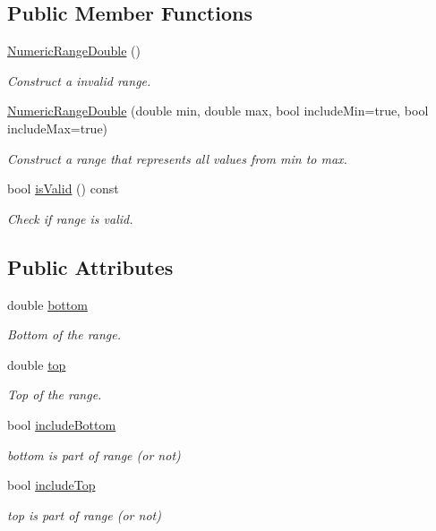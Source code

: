 \subsection*{Public Member Functions}
\begin{DoxyCompactItemize}
\item 
\hyperlink{structmdt_algorithms_1_1_numeric_range_double_add368d5a7de1c2ac042e90b7c1429ced}{Numeric\-Range\-Double} ()
\begin{DoxyCompactList}\small\item\em Construct a invalid range. \end{DoxyCompactList}\item 
\hyperlink{structmdt_algorithms_1_1_numeric_range_double_afcfeef78bbba9f4dc29727b037a6a9c5}{Numeric\-Range\-Double} (double min, double max, bool include\-Min=true, bool include\-Max=true)
\begin{DoxyCompactList}\small\item\em Construct a range that represents all values from min to max. \end{DoxyCompactList}\item 
bool \hyperlink{structmdt_algorithms_1_1_numeric_range_double_aad7ba012ebbc5e2f5267044576d53153}{is\-Valid} () const 
\begin{DoxyCompactList}\small\item\em Check if range is valid. \end{DoxyCompactList}\end{DoxyCompactItemize}
\subsection*{Public Attributes}
\begin{DoxyCompactItemize}
\item 
double \hyperlink{structmdt_algorithms_1_1_numeric_range_double_ad4a4a826ebf86f43af5f9543eb404255}{bottom}
\begin{DoxyCompactList}\small\item\em Bottom of the range. \end{DoxyCompactList}\item 
double \hyperlink{structmdt_algorithms_1_1_numeric_range_double_a2a0da5ccbeee1a3f8a613b7e7655d326}{top}
\begin{DoxyCompactList}\small\item\em Top of the range. \end{DoxyCompactList}\item 
bool \hyperlink{structmdt_algorithms_1_1_numeric_range_double_a9984b8035c067b09372d6f72efe8a380}{include\-Bottom}
\begin{DoxyCompactList}\small\item\em bottom is part of range (or not) \end{DoxyCompactList}\item 
bool \hyperlink{structmdt_algorithms_1_1_numeric_range_double_a1952d279de07fc5242defab4986a5fb3}{include\-Top}
\begin{DoxyCompactList}\small\item\em top is part of range (or not) \end{DoxyCompactList}\end{DoxyCompactItemize}



